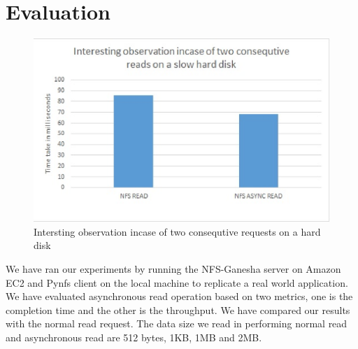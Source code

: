 \section{Evaluation}
\begin{figure}
\centering
\includegraphics[scale=1.0]{figures/InterstingObservation.eps}
\caption{Intersting observation incase of two consequtive requests on a hard disk}
\label{fig:InterstingObservation}
\end{figure}

	We have ran our experiments by running the NFS-Ganesha server on Amazon EC2 and Pynfs client on the local machine to replicate a real world application.  We have evaluated asynchronous read operation based on two metrics, one is the completion time and the other is the throughput. We have compared our results with the normal read request. The data size we read in performing normal read and asynchronous read are 512 bytes, 1KB, 1MB and 2MB. 

